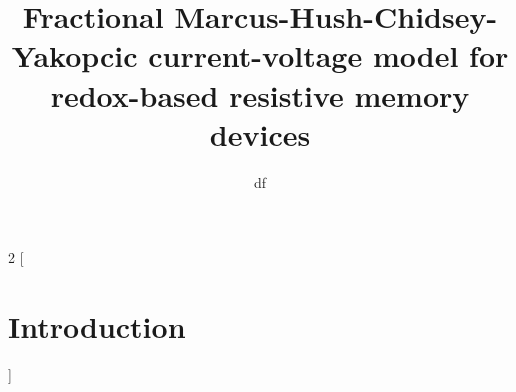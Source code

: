 \documentclass{IEEEtran}
\title{Fractional Marcus-Hush-Chidsey-Yakopcic current-voltage model for redox-based
resistive memory devices}
\author{df}
\begin{document}
\maketitle
\begin{multicols}{2}
[
\section{Introduction}
\blindtext \blindtext \blindtext \blindtext \blindtext \blindtext
]
\end{multicols}
\end{document}
